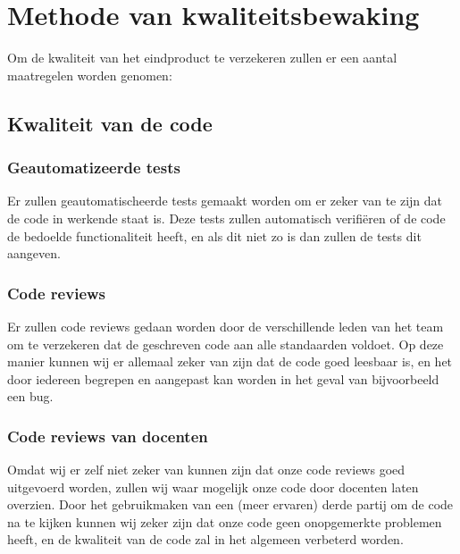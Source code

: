\chapter{Methode van kwaliteitsbewaking}



Om de kwaliteit van het eindproduct te verzekeren zullen er een aantal maatregelen worden genomen:

\section{Kwaliteit van de code}
	\subsection{Geautomatizeerde tests}
		Er zullen geautomatischeerde tests gemaakt worden om er zeker van te zijn dat de code in werkende staat is.
		Deze tests zullen automatisch verifiëren of de code de bedoelde functionaliteit heeft, en als dit niet zo is dan zullen de tests dit aangeven.

	\subsection{Code reviews}
		Er zullen code reviews gedaan worden door de verschillende leden van het team om te verzekeren dat de geschreven code aan alle standaarden voldoet.
		Op deze manier kunnen wij er allemaal zeker van zijn dat de code goed leesbaar is, en het door iedereen begrepen en aangepast kan worden in het geval van bijvoorbeeld een bug.
		
	\subsection{Code reviews van docenten}
		Omdat wij er zelf niet zeker van kunnen zijn dat onze code reviews goed uitgevoerd worden, zullen wij waar mogelijk onze code door docenten laten overzien.
		Door het gebruikmaken van een (meer ervaren) derde partij om de code na te kijken kunnen wij zeker zijn dat onze code geen onopgemerkte problemen heeft, en de kwaliteit van de code zal in het algemeen verbeterd worden.


